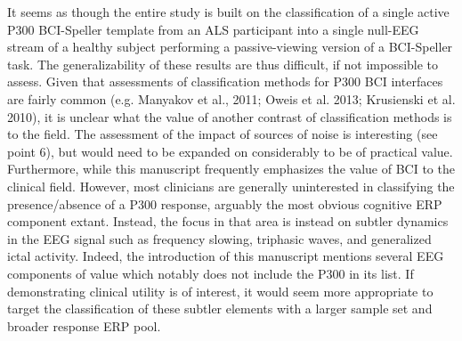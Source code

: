 It seems as though the entire study is built on the classification of a single active P300 BCI-Speller template from an ALS participant into a single null-EEG stream of a healthy subject performing a passive-viewing version of a BCI-Speller task. The generalizability of these results are thus difficult, if not impossible to assess. Given that assessments of classification methods for P300 BCI interfaces are fairly common (e.g. Manyakov et al., 2011; Oweis et al. 2013; Krusienski et al. 2010), it is unclear what the value of another contrast of classification methods is to the field. The assessment of the impact of sources of noise is interesting (see point 6), but would need to be expanded on considerably to be of practical value. Furthermore, while this manuscript frequently emphasizes the value of BCI to the clinical field. However, most clinicians are generally uninterested in classifying the presence/absence of a P300 response, arguably the most obvious cognitive ERP component extant. Instead, the focus in that area is instead on subtler dynamics in the EEG signal such as frequency slowing, triphasic waves, and generalized ictal activity. Indeed, the introduction of this manuscript mentions several EEG components of value which notably does not include the P300 in its list. If demonstrating clinical utility is of interest, it would seem more appropriate to target the classification of these subtler elements with a larger sample set and broader response ERP pool.